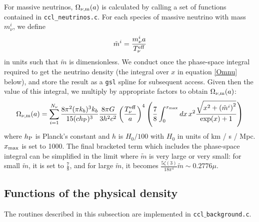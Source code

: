 \documentclass[\docopts]{\docclass}
\begin{document}
For massive neutrinos, $\Omega_{\nu, {\rm m}}(a)$ is calculated by calling a set of functions contained in {\tt ccl\_neutrinos.c}. For each species of massive neutrino with mass $m_\nu^i$, we define
\begin{equation}
\tilde{m}^i = \frac{m_{\nu}^{i}a}{T_{\nu}^{\rm eff}}
\label{mnuOT}
\end{equation}
in units such that $\tilde{m}$ is dimensionless. We conduct once the phase-space integral required to get the neutrino density (the integral over $x$ in equation \ref{Omnu} below), and store the result as a {\tt gsl} spline for subsequent access. Given then the value of this integral, we multiply by appropriate factors to obtain $\Omega_{\nu, {\rm m}}(a)$:
\begin{equation}
\Omega_{\nu, {\rm m}}(a) = \sum_{i=1}^{N_\nu} \frac{8 \pi^2(\pi k_b )^3 k_b}{15(c h_{\rm P})^3} \frac{8 \pi G}{3h^2c^2} \left(\frac{T_{\nu}^{\rm eff}}{a}\right)^4 \left(\frac{7}{8}\int_0^{x_{\rm max}} dx \, x^2 \frac{\sqrt{x^2 + \left(\tilde{m}^i\right)^2}}{\exp(x) + 1}\right)
\label{Omnu}
\end{equation}
where $h_{\rm P}$ is Planck's constant and $h$ is $H_0/100$ with $H_0$ in units of km / s / Mpc. $x_{\rm max}$ is set to 1000. The final bracketed term which includes the phase-space integral can be simplified in the limit where $\tilde{m}$ is very large or very small: for small $\tilde{m}$, it is set to $\frac{7}{8}$, and for large $\tilde{m}$, it becomes $\frac{5\zeta(3)}{18\pi^4}\tilde{m}\sim 0.2776\mu$.


\subsection{Functions of the physical density}
\label{subsec:physicaldensity}

The routines described in this subsection are implemented in {\tt ccl$\_$background.c}.
\end{document}
